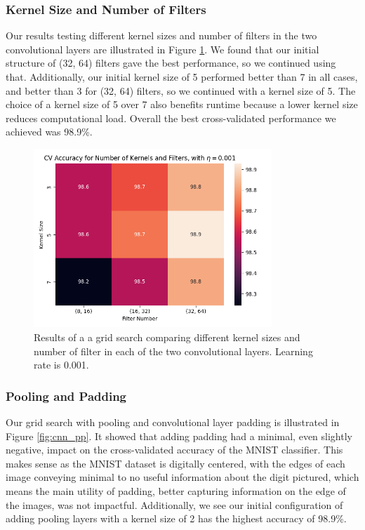 \subsubsection{Kernel Size and Number of Filters}
Our results testing different kernel sizes and number of filters in the two convolutional layers are illustrated in Figure \ref{fig:cnn_kf}. We found that our initial structure of (32, 64) filters gave the best performance, so we continued using that. Additionally, our initial kernel size of 5 performed better than 7 in all cases, and better than 3 for (32, 64) filters, so we continued with a kernel size of 5. The choice of a kernel size of 5 over 7 also benefits runtime because a lower kernel size reduces computational load. Overall the best cross-validated performance we achieved was 98.9\%.
\begin{figure}[H]
    \centering
    \includegraphics[width=0.8\textwidth]{results/cnn_grid_search/heatmap_grid_search_kf.png}
    \caption{Results of a a grid search comparing different kernel sizes and number of filter in each of the two convolutional layers. Learning rate is 0.001.}
    \label{fig:cnn_kf}
\end{figure}

\newpage
\subsubsection{Pooling and Padding}
Our grid search with pooling and convolutional layer padding is illustrated in Figure \ref{fig:cnn_pp}. It showed that adding padding had a minimal, even slightly negative, impact on the cross-validated accuracy of the MNIST classifier. This makes sense as the MNIST dataset is digitally centered, with the edges of each image conveying minimal to no useful information about the digit pictured, which means the main utility of padding, better capturing information on the edge of the images, was not impactful. Additionally, we see our initial configuration of adding pooling layers with a kernel size of 2 has the highest accuracy of 98.9\%.

